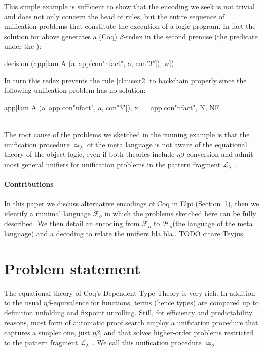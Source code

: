\documentclass[sigconf,natbib=false]{acmart}
\newcommand{\UnifRel}{\ensuremath{\simeq}}
\newcommand{\Uo}{\ensuremath{\UnifRel_o}\xspace}
\newcommand{\Ue}{\ensuremath{\UnifRel_\lambda}\xspace}
\newcommand{\llambda}{\ensuremath{\mathcal{L}_\lambda}\xspace}
\newcommand{\Fo}{\ensuremath{\mathcal{F}_{\!o}\xspace}} %
\newcommand{\Ho}{\ensuremath{\mathcal{H}_o}\xspace}
\begin{document}
\noindent
This simple example is sufficient to show that the encoding we seek
is not trivial and does not only concern the head of rules, but the entire sequence
of unification problems that constitute the execution of a logic program.
In fact
the solution for  above generates a
(Coq) $\beta$-redex in the second premise (the predicate
under the \hspace{-0.4em}):

\begin{elpicode}
decision (app[lam A (a\ app[con"nfact", a, con"3"]), w])
\end{elpicode}

\noindent
In turn this redex prevents the rule \ref{clause:r2} to backchain properly since
the following unification problem has no solution:

\begin{elpicode}
app[lam A (a\ app[con"nfact", a, con"3"]), x] =
app[con"nfact", N, NF]
\end{elpicode}
\noindent
~\\
The root cause of the problems we sketched in the running example
is that the unification procedure \Ue of the meta language is not aware
of the equational theory of the object logic, even if both theories
include $\eta\beta$-conversion and admit most general
unifiers for unification problems in the pattern fragment \llambda~\cite{miller92jsc}.

\paragraph{Contributions}
In this paper we discuss alternative encodings of Coq in
Elpi (Section~\ref{sec:encodings}), then we identify a minimal language \Fo{}
in which the problems sketched here can be fully described.
We then detail an encoding  from \Fo{} to \Ho (the language of
the meta language) and a decoding  to relate the unifiers
bla bla.. TODO citare Teyjus.

\section{Problem statement} %
\label{sec:encodings}

The equational theory of Coq's Dependent Type Theory is very rich. In
addition to the usual $\eta\beta$-equivalence for functions, terms (hence types)
are compared up to definition unfolding and fixpoint unrolling. Still,
for efficiency and predictability reasons, most form of automatic proof search
employ a unification procedure that captures a simpler one,
just $\eta\beta$, and that solves higher-order problems
restricted to the pattern fragment $\mathcal{L}_\lambda$~\cite{miller92jsc}.
We call this unification procedure \Uo{}.
\end{document}
